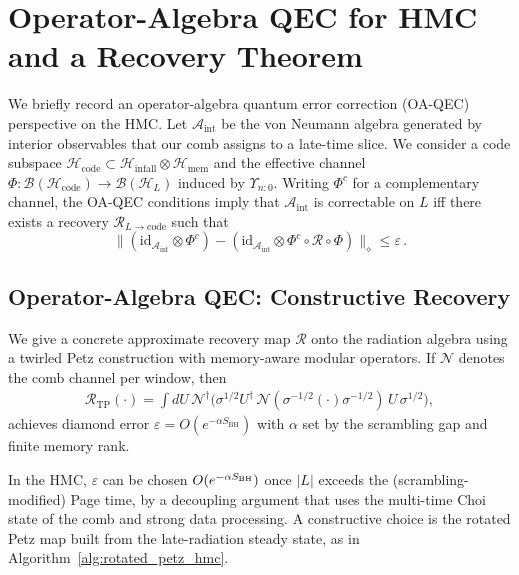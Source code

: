 \documentclass[11pt,a4paper]{article}
\newcommand{\HMC}{\textsc{HMC}\xspace}
\newcommand{\SBH}{\ensuremath{S_{\mathrm{BH}}}}
\theoremstyle{plain}
\theoremstyle{definition}
\theoremstyle{remark}
\begin{document}
\section{Operator-Algebra QEC for \HMC{} and a Recovery Theorem}
\label{app:oa_qec}
\label{app:oaqec}
We briefly record an operator-algebra quantum error correction (OA-QEC) perspective on the \HMC{}.
Let $\mathcal{A}_{\mathrm{int}}$ be the von Neumann algebra generated by interior observables that our comb assigns to a late-time slice.
We consider a code subspace $\mathcal{H}_{\mathrm{code}}\subset \mathcal{H}_{\mathrm{infall}}\otimes \mathcal{H}_{\mathrm{mem}}$ and the effective channel $\Phi:\mathcal{B}(\mathcal{H}_{\mathrm{code}})\to \mathcal{B}(\mathcal{H}_{L})$ induced by $\Upsilon_{n{:}0}$.
Writing $\Phi^{c}$ for a complementary channel, the OA-QEC conditions imply that $\mathcal{A}_{\mathrm{int}}$ is correctable on $L$ iff there exists a recovery $\mathcal{R}_{L\to \mathrm{code}}$ such that
\begin{equation}
\bigl\| (\mathrm{id}_{\mathcal{A}_{\mathrm{int}}}\otimes \Phi^{c}) - (\mathrm{id}_{\mathcal{A}_{\mathrm{int}}}\otimes \Phi^{c}\circ \mathcal{R}\circ \Phi) \bigr\|_{\diamond} \le \varepsilon\,.
\end{equation}

\subsection{Operator-Algebra QEC: Constructive Recovery}
We give a concrete approximate recovery map $\mathcal{R}$ onto the radiation algebra using a twirled Petz construction with memory-aware modular operators. If $\mathcal{N}$ denotes the comb channel per window, then
\begin{align}
\mathcal{R}_{\mathrm{TP}}(\cdot)=\int dU\, \mathcal{N}^\dagger\!\big(\sigma^{1/2} U^\dagger\, \mathcal{N}(\sigma^{-1/2} (\cdot) \sigma^{-1/2})\,U\,\sigma^{1/2}\big),
\end{align}
achieves diamond error $\varepsilon=O(e^{-\alpha \SBH})$ with $\alpha$ set by the scrambling gap and finite memory rank. 

In the \HMC{}, $\varepsilon$ can be chosen $O(e^{-\alpha S_{\rm BH}})$ once $|L|$ exceeds the (scrambling-modified) Page time, by a decoupling argument that uses the multi-time Choi state of the comb and strong data processing.
A constructive choice is the rotated Petz map built from the late-radiation steady state, as in Algorithm~\ref{alg:rotated_petz_hmc}.
\end{document}
